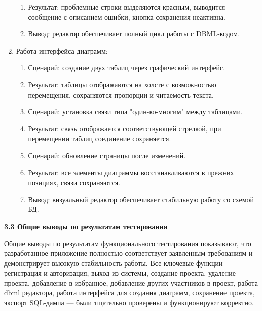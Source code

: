 \begin{enumerate}
\begin{enumerate}
    \item Результат: проблемные строки выделяются красным, выводится сообщение с описанием ошибки, кнопка сохранения неактивна.
    
    \item Вывод: редактор обеспечивает полный цикл работы с DBML-кодом.

    \end{enumerate}

\item Работа интерфейса диаграмм:
    \begin{enumerate}
    \item Сценарий: создание двух таблиц через графический интерфейс.
    
    \item Результат: таблицы отображаются на холсте с возможностью перемещения, сохраняются пропорции и читаемость текста.
    
    \item Сценарий: установка связи типа "один-ко-многим" между таблицами.
    
    \item Результат: связь отображается соответствующей стрелкой, при перемещении таблиц соединение сохраняется.
    
    \item Сценарий: обновление страницы после изменений.
    
    \item Результат: все элементы диаграммы восстанавливаются в прежних позициях, связи сохраняются.
    
    \item Вывод: визуальный редактор обеспечивает стабильную работу со схемой БД.

    \end{enumerate}
    
\end{enumerate}

\textbf{\large 3.3 Общие выводы по результатам тестирования}

Общие выводы по результатам функционального тестирования
показывают, что разработанное приложение полностью соответствует
заявленным требованиям и демонстрирует высокую стабильность работы. Все
ключевые функции — регистрация
и авторизация, выход из системы, создание проекта, удаление проекта, добавление в избранное, добавление других участников в проект, работа dbml редактора, работа интерфейса для создания диаграмм, сохранение проекта, экспорт SQL-дампа — были тщательно проверены и
функционируют корректно.

